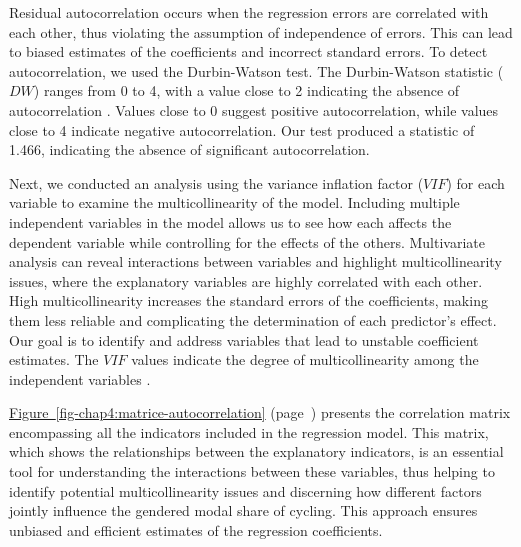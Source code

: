 \begin{refsegment}
Residual autocorrelation occurs when the regression errors are correlated with each other, thus violating the assumption of independence of errors. This can lead to biased estimates of the coefficients and incorrect standard errors. To detect autocorrelation, we used the Durbin-Watson test. The Durbin-Watson statistic (\(DW\)) ranges from 0 to 4, with a value close to 2 indicating the absence of autocorrelation \textcolor{blue}{\autocite{durbin_testing_1950}}. Values close to 0 suggest positive autocorrelation, while values close to 4 indicate negative autocorrelation. Our test produced a statistic of 1.466, indicating the absence of significant autocorrelation. %

Next, we conducted an analysis using the variance inflation factor (\(VIF\)) for each variable to examine the multicollinearity of the model. Including multiple independent variables in the model allows us to see how each affects the dependent variable while controlling for the effects of the others. Multivariate analysis can reveal interactions between variables and highlight multicollinearity issues, where the explanatory variables are highly correlated with each other. High multicollinearity increases the standard errors of the coefficients, making them less reliable and complicating the determination of each predictor's effect. Our goal is to identify and address variables that lead to unstable coefficient estimates. The \(VIF\) values indicate the degree of multicollinearity among the independent variables \textcolor{blue}{\autocites{akinwande_variance_2015}{tamura_mixed_2019}}. %

\hyperref[fig-chap4:matrice-autocorrelation]{Figure~\ref{fig-chap4:matrice-autocorrelation}} (page~\pageref{fig-chap4:matrice-autocorrelation}) presents the correlation matrix encompassing all the indicators included in the regression model. This matrix, which shows the relationships between the explanatory indicators, is an essential tool for understanding the interactions between these variables, thus helping to identify potential multicollinearity issues and discerning how different factors jointly influence the gendered modal share of cycling. This approach ensures unbiased and efficient estimates of the regression coefficients. %


\end{refsegment}
